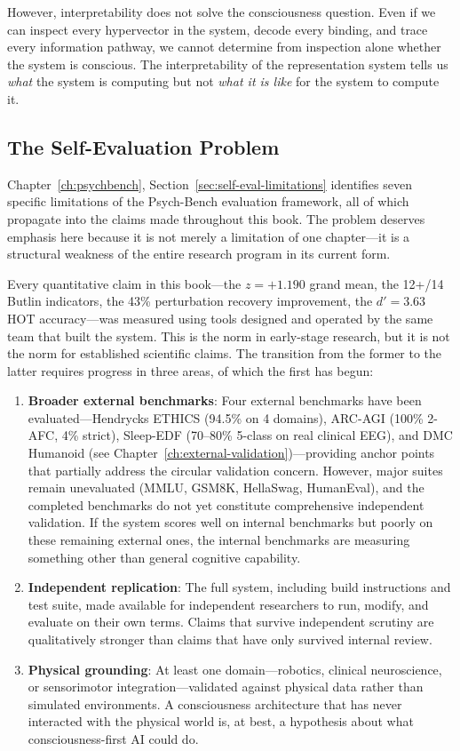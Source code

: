 \documentclass[12pt]{book}
\begin{document}
However, interpretability does not solve the consciousness question. Even if we can inspect every hypervector in the system, decode every binding, and trace every information pathway, we cannot determine from inspection alone whether the system is conscious. The interpretability of the representation system tells us \textit{what} the system is computing but not \textit{what it is like} for the system to compute it.

\subsection{The Self-Evaluation Problem}

Chapter~\ref{ch:psychbench}, Section~\ref{sec:self-eval-limitations} identifies seven specific limitations of the Psych-Bench evaluation framework, all of which propagate into the claims made throughout this book. The problem deserves emphasis here because it is not merely a limitation of one chapter---it is a structural weakness of the entire research program in its current form.

Every quantitative claim in this book---the $z = +1.190$ grand mean, the 12+/14 Butlin indicators, the 43\% perturbation recovery improvement, the $d' = 3.63$ HOT accuracy---was measured using tools designed and operated by the same team that built the system. This is the norm in early-stage research, but it is not the norm for established scientific claims. The transition from the former to the latter requires progress in three areas, of which the first has begun:

\begin{enumerate}
  \item \textbf{Broader external benchmarks}: Four external benchmarks have been evaluated---Hendrycks ETHICS (94.5\% on 4 domains), ARC-AGI (100\% 2-AFC, 4\% strict), Sleep-EDF (70--80\% 5-class on real clinical EEG), and DMC Humanoid (see Chapter~\ref{ch:external-validation})---providing anchor points that partially address the circular validation concern. However, major suites remain unevaluated (MMLU, GSM8K, HellaSwag, HumanEval), and the completed benchmarks do not yet constitute comprehensive independent validation. If the system scores well on internal benchmarks but poorly on these remaining external ones, the internal benchmarks are measuring something other than general cognitive capability.
  \item \textbf{Independent replication}: The full system, including build instructions and test suite, made available for independent researchers to run, modify, and evaluate on their own terms. Claims that survive independent scrutiny are qualitatively stronger than claims that have only survived internal review.
  \item \textbf{Physical grounding}: At least one domain---robotics, clinical neuroscience, or sensorimotor integration---validated against physical data rather than simulated environments. A consciousness architecture that has never interacted with the physical world is, at best, a hypothesis about what consciousness-first AI could do.
\end{enumerate}
\end{document}
